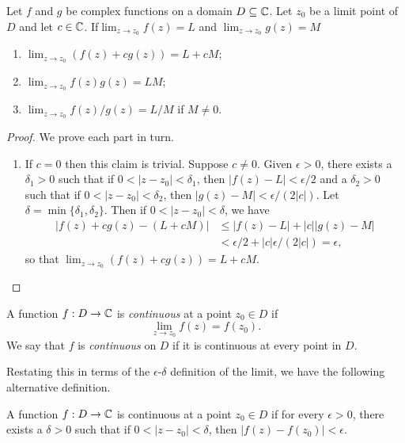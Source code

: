 \begin{theorem}%
    Let \(f\) and \(g\) be complex functions on a domain \(D \subseteq \mathbb{C}\). Let \(z_0\) be a limit point of \(D\) and let \(c \in \mathbb{C}\). If\(\lim_{z \to z_0} f(z) = L\) and \(\lim_{z \to z_0} g(z) = M\)
    \begin{enumerate}[label=(\alph*)]
        \item \(\lim_{z \to z_0} (f(z) + c g(z)) = L + cM\);
        \item \(\lim_{z \to z_0} f(z)g(z) = LM\);
        \item \(\lim_{z \to z_0} f(z)/g(z) = L/M\) if \(M \neq 0\).
    \end{enumerate}
\end{theorem}

\begin{proof}
    We prove each part in turn.
    \begin{enumerate}[label=(\alph*), wide]
        \item If \(c = 0\) then this claim is trivial. Suppose \(c \neq 0\). Given \(\epsilon > 0\), there exists a \(\delta_1 > 0\) such that if \(0 < |z - z_0| < \delta_1\), then \(|f(z) - L| < \epsilon/2\) and a \(\delta_2 > 0\) such that if \(0 < |z - z_0| < \delta_2\), then \(|g(z) - M| < \epsilon/(2|c|)\). Let \(\delta = \min\{\delta_1, \delta_2\}\). Then if \(0 < |z - z_0| < \delta\), we have
        \begin{align*}
            |f(z) + cg(z) - (L + cM)| &\leq |f(z) - L| + |c||g(z) - M|\\
                    &< \epsilon/2 + |c|\epsilon/(2|c|) = \epsilon,
        \end{align*}
        so that \(\lim_{z \to z_0} (f(z) + cg(z)) = L + cM\).
    \end{enumerate}
\end{proof}

\begin{definition}[Continuity]
    A function \(f : D \to \mathbb{C}\) is \emph{continuous} at a point \(z_0 \in D\) if
    \[
        \lim_{z \to z_0} f(z) = f(z_0).
    \]
    We say that \(f\) is \emph{continuous} on \(D\) if it is continuous at every point in \(D\).
    \label{def:continuity}
\end{definition}

Restating this in terms of the \(\epsilon\)-\(\delta\) definition of the limit, we have the following alternative definition.

\begin{definition}%
    A function \(f : D \to \mathbb{C}\) is continuous at a point \(z_0 \in D\) if for every \(\epsilon > 0\), there exists a \(\delta > 0\) such that if \(0 < |z - z_0| < \delta\), then \(|f(z) - f(z_0)| < \epsilon\).
    \label{de:continuity-epsilon-delta}
\end{definition}

